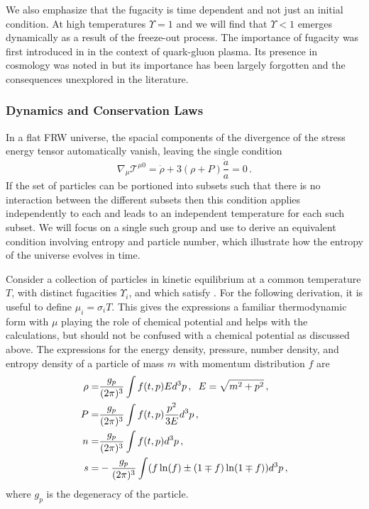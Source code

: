  We also emphasize that the fugacity is time dependent and not just an initial condition.  At high temperatures $\Upsilon=1$ and we will find that $\Upsilon<1$ emerges dynamically as a result of the freeze-out process. The importance of fugacity was first introduced in \cite{Rafelski:1982pu} in the context of quark-gluon plasma.  Its presence in cosmology was noted in  \cite{Bernstein:1985th,Dolgov:1992wf} but its importance has been largely forgotten and the consequences unexplored in the literature.  





\subsubsection{Dynamics and Conservation Laws}
In a flat FRW universe, the spacial components of the divergence of the stress energy tensor automatically vanish, leaving the single condition
\begin{equation}\label{stress_energy_eq}
\nabla_\mu \mathcal{T}^{\mu 0}=\dot{\rho}+3\left(\rho+P\right)\frac{\dot{a}}{a}=0\,.
\end{equation}
If the set of particles can be portioned into subsets such that there is no interaction between the different subsets then this condition applies independently to each and leads to an independent temperature for each such subset.  We will focus on a single such group and use   to derive an equivalent condition involving entropy and particle number, which illustrate how the entropy of the universe evolves in time. 

Consider a  collection of particles in kinetic equilibrium at a common temperature $T$, with distinct fugacities $\Upsilon_i$, and  which satisfy .   For the following derivation, it is useful to define $\mu_i=\sigma_i T$.  This gives the expressions a familiar thermodynamic form with $\mu$ playing the role of chemical potential and helps with the calculations, but should not be confused with a chemical potential as discussed above.  The expressions for the  energy density, pressure, number density, and entropy density of a particle of mass $m$ with momentum distribution $f$ are
\begin{align}\label{moments}
\rho=&\frac{g_p}{(2\pi)^3}\int f(t,p)Ed^3p\,, \hspace{2mm} E=\sqrt{m^2+p^2}\,,\\
P=&\frac{g_p}{(2\pi)^3}\int f(t,p)\frac{p^2}{3E}d^3p\,,\\
n=&\frac{g_p}{(2\pi)^3}\int f(t,p) d^3p\,,\\
s=&-\frac{g_p}{(2\pi)^3}\int (f\ln(f)\pm(1\mp f)\ln(1\mp f)) d^3p\,,
\end{align}
where $g_p$ is the degeneracy of the particle.

